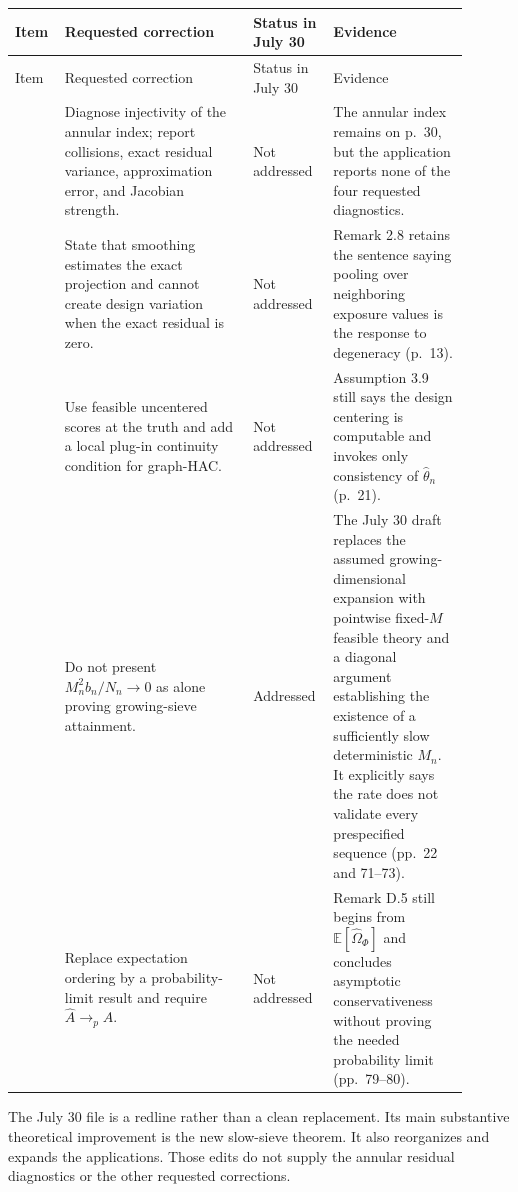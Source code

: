 \documentclass[11pt]{article}
\newcommand{\E}{\mathbb{E}}
\begin{document}
\begin{longtable}{>{\raggedright\arraybackslash}p{0.09\linewidth}
                  >{\raggedright\arraybackslash}p{0.39\linewidth}
                  >{\raggedright\arraybackslash}p{0.13\linewidth}
                  >{\raggedright\arraybackslash}p{0.29\linewidth}}
\toprule
Item & Requested correction & Status in July 30 & Evidence \\
\midrule
\endfirsthead
\toprule
Item & Requested correction & Status in July 30 & Evidence \\
\midrule
\endhead
0.1 & Diagnose injectivity of the annular index; report collisions, exact
residual variance, approximation error, and Jacobian strength. &
Not addressed &
The annular index remains on p.~30, but the application reports none of the
four requested diagnostics. \\
\addlinespace
0.2 & State that smoothing estimates the exact projection and cannot create
design variation when the exact residual is zero. &
Not addressed &
Remark 2.8 retains the sentence saying pooling over neighboring exposure
values is the response to degeneracy (p.~13). \\
\addlinespace
0.3 & Use feasible uncentered scores at the truth and add a local plug-in
continuity condition for graph-HAC. &
Not addressed &
Assumption 3.9 still says the design centering is computable and invokes only
consistency of \(\widehat\theta_n\) (p.~21). \\
\addlinespace
0.4 & Do not present \(M_n^2b_n/N_n\to0\) as alone proving growing-sieve
attainment. &
Addressed &
The July 30 draft replaces the assumed growing-dimensional expansion with
pointwise fixed-\(M\) feasible theory and a diagonal argument establishing the
existence of a sufficiently slow deterministic \(M_n\). It explicitly says the
rate does not validate every prespecified sequence (pp.~22 and 71--73). \\
\addlinespace
0.5 & Replace expectation ordering by a probability-limit result and require
\(\widehat A\to_p A\). &
Not addressed &
Remark D.5 still begins from \(\E[\widehat\Omega_\Phi]\) and concludes
asymptotic conservativeness without proving the needed probability limit
(pp.~79--80). \\
\bottomrule
\end{longtable}

The July 30 file is a redline rather than a clean replacement. Its main
substantive theoretical improvement is the new slow-sieve theorem. It also
reorganizes and expands the applications. Those edits do not supply the
annular residual diagnostics or the other requested corrections.
\end{document}
